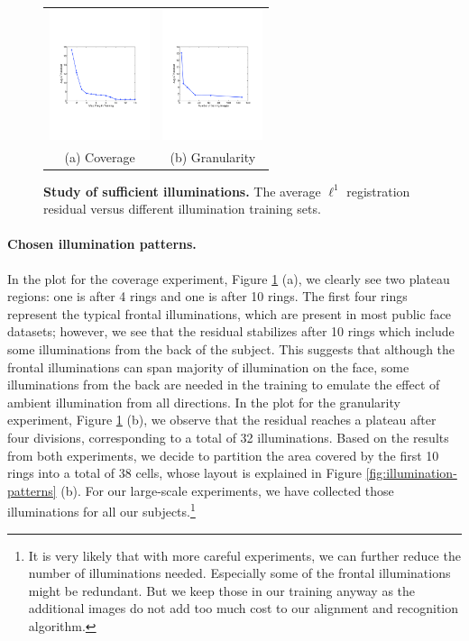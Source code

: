\begin{figure}
\centering
\begin{tabular}{cc}
\includegraphics[height=1.5in]{figures_cvpr/illum_results/coverage_sunset.pdf} &
\includegraphics[height=1.5in]{figures_cvpr/illum_results/granularity_sunset.pdf} \\
(a) Coverage & (b) Granularity
\end{tabular}\vspace{2mm}
\caption{{\bf Study of sufficient illuminations.} The average $\ell^1$ registration residual versus different illumination training sets. \vspace{0mm}}
\label{fig:illumination-sufficiency}
\end{figure}

\vspace{0mm}\paragraph{Chosen illumination patterns.} In the plot for the coverage experiment, Figure \ref{fig:illumination-sufficiency} (a), we clearly see two plateau regions: one is after 4 rings and one is after 10 rings. The first four rings represent the typical frontal illuminations, which are present in most public face datasets; however, we see that the residual stabilizes after 10 rings which include some illuminations from the back of the subject. This suggests that although the frontal illuminations can span majority of illumination on the face, some illuminations from the back are needed in the training to emulate the effect of ambient illumination from all directions. In the plot for the granularity experiment, Figure \ref{fig:illumination-sufficiency} (b), we observe that the residual reaches a plateau after four divisions, corresponding to a total of 32 illuminations. Based on the results from both experiments, we decide to partition the area covered by the first 10 rings into a total of 38 cells, whose layout is explained in Figure \ref{fig:illumination-patterns} (b). For our large-scale experiments, we have collected those illuminations for all our subjects.\footnote{It is very likely that with more careful experiments, we can further reduce the number of illuminations needed. Especially some of the frontal illuminations might be redundant. But we keep those in our training anyway as the additional images do not add too much cost to our alignment and recognition algorithm.} 

